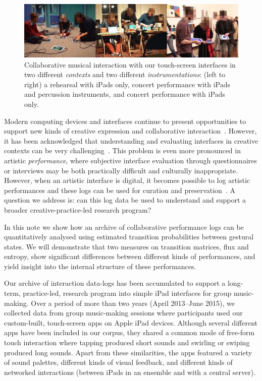 \documentclass{sigchi}
\begin{document}
\begin{figure}
  \centering
  \includegraphics[width=\linewidth]{figures/three-performance-contexts}
  \caption{Collaborative musical interaction with our touch-screen
    interfaces in two different {\em contexts} and two different {\em
      instrumentations}: (left to right) a rehearsal with iPads only,
    concert performance with iPads and percussion instruments, and
    concert performance with iPads
    only.\label{fig:three-performance-contexts}}
\end{figure}


Modern computing devices and interfaces continue to present
opportunities to support new kinds of creative expression and
collaborative interaction~\cite{Resnick:2005yu}. However, it has been
acknowledged that understanding and evaluating interfaces in creative
contexts can be very challenging~\cite{Shneiderman:2007qv}. This problem is
even more pronounced in artistic \emph{performance}, where subjective
interface evaluation through questionnaires or interviews may be both
practically difficult and culturally inappropriate. However, when an artistic interface
is digital, it becomes possible to log artistic performances and these
logs can be used for curation and
preservation~\cite{England:2014ys}. A question we address is: can this log data
be used to understand and support a
broader creative-practice-led research program?

In this note we show how an archive of collaborative performance logs
can be quantitatively analysed using estimated transition
probabilities between gestural states. We will demonstrate that two
measures on transition matrices, flux and entropy, show significant
differences between different kinds of performances, and yield insight
into the internal structure of these performances.

Our archive of interaction data-logs has been accumulated to support a
long-term, practice-led, research program into simple iPad interfaces
for group music-making. Over a period of more than two years (April
2013--June 2015), we collected data from group music-making sessions
where participants used our custom-built, touch-screen apps on Apple
iPad devices. Although several different apps have been included in
our corpus, they shared a common mode of free-form touch interaction
where tapping produced short sounds and swirling or swiping produced
long sounds. Apart from these similarities, the apps featured a
variety of sound palettes, different kinds of visual feedback, and
different kinds of networked interactions (between iPads in an
ensemble and with a central server).
\end{document}
